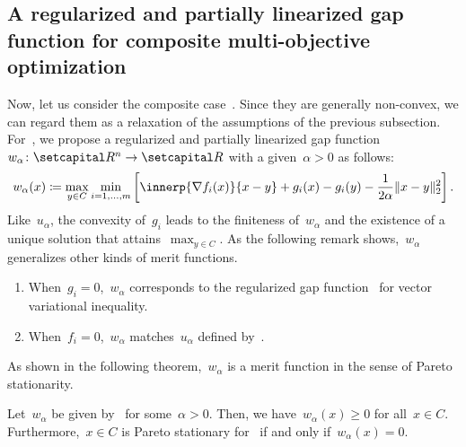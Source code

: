 \documentclass[../../main]{subfiles}
\begin{document}
\subsection{A regularized and partially linearized gap function for composite multi-objective optimization} 
Now, let us consider the composite case~.
Since they are generally non-convex, we can regard them as a relaxation of the assumptions of the previous subsection.
For~, we propose a regularized and partially linearized gap function~$w_\alpha \colon \setR^n \to \setR$ with a given~$\alpha > 0$ as follows:
\begin{equation} \label{eq:reg_lin_gap_MO}
    w_\alpha(x) \coloneqq \max_{y \in C} \min_{i = 1, \dots, m} \left[ \innerp{\nabla f_i(x)}{x - y} + g_i(x) - g_i(y) - \frac{1}{2 \alpha} \norm{x - y}_2^2 \right]
    .\end{equation}
Like~$u_\alpha$, the convexity of~$g_i$ leads to the finiteness of~$w_\alpha$ and the existence of a unique solution that attains~$\max_{y \in C}$.
As the following remark shows,~$w_\alpha$ generalizes other kinds of merit functions.
\begin{remark} 
    \begin{enumerate}
        \item When~$g_i = 0$,~$w_\alpha$ corresponds to the regularized gap function~ for vector variational inequality. 
        \item When~$f_i = 0$,~$w_\alpha$ matches~$u_\alpha$ defined by~. 
    \end{enumerate}
\end{remark}
As shown in the following theorem,~$w_\alpha$ is a merit function in the sense of Pareto stationarity.
\begin{theorem} 
    Let~$w_\alpha$ be given by~ for some~$\alpha > 0$.
    Then, we have~$w_\alpha(x) \ge 0$ for all~$x \in C$.
    Furthermore,~$x \in C$ is Pareto stationary for~ if and only if~$w_\alpha(x) = 0$.
\end{theorem}
\end{document}
